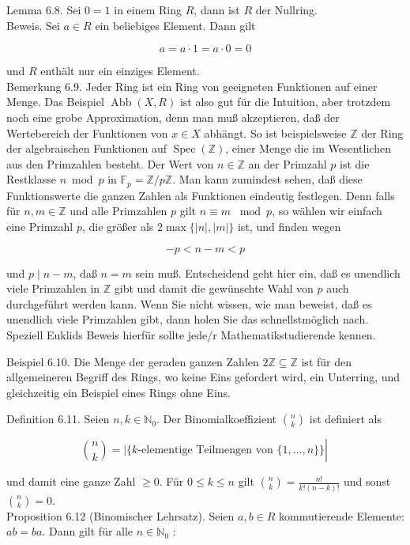 \documentclass[10pt, letterpaper]{article}
\begin{document}
Lemma 6.8. Sei $0=1$ in einem Ring $R$, dann ist $R$ der Nullring.\\
Beweis. Sei $a \in R$ ein beliebiges Element. Dann gilt

$$
a=a \cdot 1=a \cdot 0=0
$$

und $R$ enthält nur ein einziges Element.\\
Bemerkung 6.9. Jeder Ring ist ein Ring von geeigneten Funktionen auf einer Menge. Das Beispiel $\operatorname{Abb}(X, R)$ ist also gut für die Intuition, aber trotzdem noch eine grobe Approximation, denn man muß akzeptieren, daß der Wertebereich der Funktionen von $x \in X$ abhängt. So ist beispielsweise $\mathbb{Z}$ der Ring der algebraischen Funktionen auf $\operatorname{Spec}(\mathbb{Z})$, einer Menge die im Wesentlichen aus den Primzahlen besteht. Der Wert von $n \in \mathbb{Z}$ an der Primzahl $p$ ist die Restklasse $n \bmod p$ in $\mathbb{F}_{p}=\mathbb{Z} / p \mathbb{Z}$. Man kann zumindest sehen, daß diese Funktionswerte die ganzen Zahlen als Funktionen eindeutig festlegen. Denn falls für $n, m \in \mathbb{Z}$ und alle Primzahlen $p$ gilt $n \equiv m$ $\bmod p$, so wählen wir einfach eine Primzahl $p$, die größer als $2 \max \{|n|,|m|\}$ ist, und finden wegen

$$
-p<n-m<p
$$

und $p \mid n-m$, daß $n=m$ sein muß. Entscheidend geht hier ein, daß es unendlich viele Primzahlen in $\mathbb{Z}$ gibt und damit die gewünschte Wahl von $p$ auch durchgeführt werden kann. Wenn Sie nicht wissen, wie man beweist, daß es unendlich viele Primzahlen gibt, dann holen Sie das schnellstmöglich nach. Speziell Euklids Beweis hierfür sollte jede/r Mathematikstudierende kennen.

Beispiel 6.10. Die Menge der geraden ganzen Zahlen $2 \mathbb{Z} \subseteq \mathbb{Z}$ ist für den allgemeineren Begriff des Rings, wo keine Eins gefordert wird, ein Unterring, und gleichzeitig ein Beispiel eines Rings ohne Eins.

Definition 6.11. Seien $n, k \in \mathbb{N}_{0}$. Der Binomialkoeffizient $\binom{n}{k}$ ist definiert als

$$
\left.\binom{n}{k}=\mid\{k \text {-elementige Teilmengen von }\{1, \ldots, n\}\} \right\rvert\,
$$

und damit eine ganze Zahl $\geq 0$. Für $0 \leq k \leq n$ gilt $\binom{n}{k}=\frac{n!}{k!(n-k)!}$ und sonst $\binom{n}{k}=0$.\\
Proposition 6.12 (Binomischer Lehrsatz). Seien $a, b \in R$ kommutierende Elemente: $a b=b a$. Dann gilt für alle $n \in \mathbb{N}_{0}$ :
\end{document}
